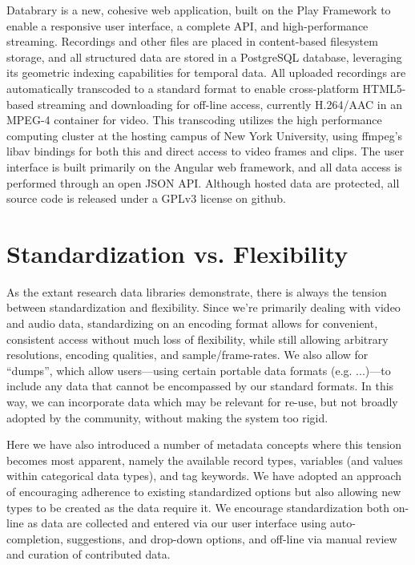 \documentclass{sig-alternate}
\begin{document}
Databrary is a new, cohesive web application, built on the Play Framework to enable a responsive user interface, a complete API, and high-performance streaming.
Recordings and other files are placed in content-based filesystem storage, and all structured data are stored in a PostgreSQL database, leveraging its geometric indexing capabilities for temporal data.
All uploaded recordings are automatically transcoded to a standard format to enable cross-platform HTML5-based streaming and downloading for off-line access, currently H.264/AAC in an MPEG-4 container for video.
This transcoding utilizes the high performance computing cluster at the hosting campus of New York University, using ffmpeg's libav bindings for both this and direct access to video frames and clips.
The user interface is built primarily on the Angular web framework, and all data access is performed through an open JSON API.
Although hosted data are protected, all source code is released under a GPLv3 license on github.

\section{Standardization vs. Flexibility}

As the extant research data libraries demonstrate, there is always the tension between standardization and flexibility.
Since we're primarily dealing with video and audio data, standardizing on an encoding format allows for convenient, consistent access without much loss of flexibility, while still allowing arbitrary resolutions, encoding qualities, and sample/frame-rates.
We also allow for ``dumps'', which allow users---using certain portable data formats (e.g. ...)---to include any data that cannot be encompassed by our standard formats. In this way, we can incorporate data which may be relevant for re-use, but not broadly adopted by the community, without making the system too rigid.

Here we have also introduced a number of metadata concepts where this tension becomes most apparent, namely the available record types, variables (and values within categorical data types), and tag keywords.
We have adopted an approach of encouraging adherence to existing standardized options but also allowing new types to be created as the data require it.
We encourage standardization both on-line as data are collected and entered via our user interface using auto-completion, suggestions, and drop-down options, and off-line via manual review and curation of contributed data.
\end{document}
